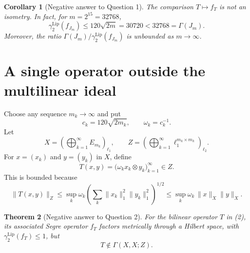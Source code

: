 \documentclass[11pt]{article}
\newtheorem{theorem}{Theorem}
\newtheorem{corollary}[theorem]{Corollary}
\newcommand{\G}{\Gamma}
\newcommand{\gLip}{\gamma^{\mathrm{Lip}}_2}
\begin{document}
\begin{corollary}[Negative answer to Question 1]\label{cor:q1}
The comparison $T\mapsto f_T$ is not an isometry.  In fact, for
$m=2^{15}=32768$,
\[
 \gLip(f_{J_m})\leq120\sqrt{2m}=30720
 <32768=\G(J_m).
\]
Moreover, the ratio $\G(J_m)/\gLip(f_{J_m})$ is unbounded as $m\to\infty$.
\end{corollary}

\section{A single operator outside the multilinear ideal}

Choose any sequence $m_k\to\infty$ and put
\[
 c_k=120\sqrt{2m_k},
 \qquad
 \omega_k=c_k^{-1}.
\]
Let
\[
 X=\left(\bigoplus_{k=1}^\infty E_{m_k}\right)_{\ell_1},
 \qquad
 Z=\left(\bigoplus_{k=1}^\infty
          \ell_1^{m_k\times m_k}\right)_{\ell_2}.
\]
For $x=(x_k)$ and $y=(y_k)$ in $X$, define
\[
 T(x,y)=\bigl(\omega_k x_k\otimes y_k\bigr)_{k=1}^\infty\in Z. \tag{2}
\]
This is bounded because
\[
 \|T(x,y)\|_Z
 \leq \sup_k\omega_k
       \left(\sum_k\|x_k\|_1^2\|y_k\|_1^2\right)^{1/2}
 \leq \sup_k\omega_k\,\|x\|_X\|y\|_X.
\]

\begin{theorem}[Negative answer to Question 2]\label{thm:q2}
For the bilinear operator $T$ in (2), its associated Segre operator $f_T$
factors metrically through a Hilbert space, with
$\gLip(f_T)\leq1$, but
\[
 T\notin\G(X,X;Z).
\]
\end{theorem}
\end{document}
